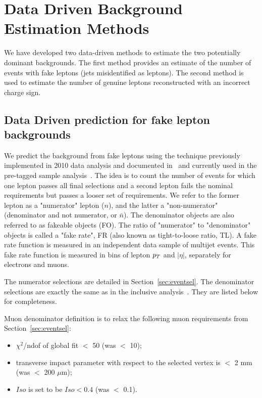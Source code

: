 \section{Data Driven Background Estimation Methods}
\label{sec:datadriven}

We have developed two data-driven methods to 
estimate the two potentially dominant backgrounds.
The first method provides an estimate of the number of events with fake leptons (jets misidentified as leptons).
The second method is used to estimate the number of genuine leptons reconstructed with an incorrect charge sign.

\subsection{Data Driven prediction for fake lepton backgrounds}
\label{sec:fakes}

We predict the background from fake leptons using the technique previously implemented in 2010 data analysis
and documented in~\cite{frmethod} and currently used in the pre-tagged sample analysis~\cite{ssnote2011}.
The idea is to count the number of events for which one lepton passes all final selections and a second lepton
fails the nominal requirements but passes a looser set of requirements. 
We refer to the former lepton as a "numerator" lepton ($n$),
and the latter a "non-numerator" (denominator and not numerator, or $\bar{n}$).
The denominator objects are also referred to as fakeable objects (FO).
The ratio of "numerator" to "denominator" objects is called a "fake rate",
 FR (also known as tight-to-loose ratio, TL).  
A fake rate function is measured in an independent data sample of multijet events.
This fake rate function is measured in bins of lepton $p_T$ and $|\eta |$,
separately for electrons and muons. 

The numerator selections are detailed in Section~\ref{sec:eventsel}. 
The denominator selections are exactly the same as in the inclusive analysis~\cite{ssnote2011}.
They are listed below for completeness.

Muon denominator definition is to relax the following muon requirements from
Section~\ref{sec:eventsel}:
\begin{itemize}
\item $\chi^2$/ndof of global fit $<$ 50 (was $<$ 10);
\item transverse impact parameter with respect to the selected vertex is
$<$ 2 mm (was $<$ 200 $\mu$m);
\item $Iso$ is set to be $Iso < 0.4$  (was $<$ 0.1).
\end{itemize}

